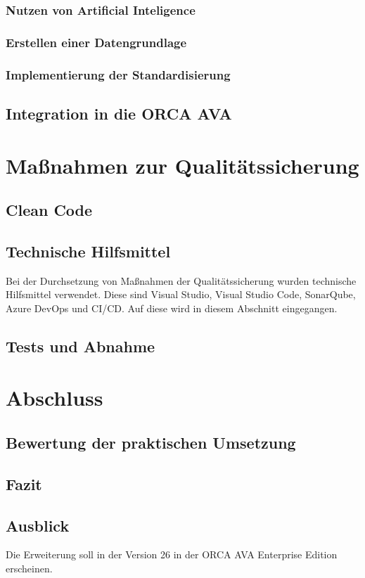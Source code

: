 \subsection{Nutzen von Artificial Inteligence}

\subsection{Erstellen einer Datengrundlage}
\subsection{Implementierung der Standardisierung}

\section{Integration in die ORCA AVA}



\chapter{Maßnahmen zur Qualitätssicherung}
\label{c:qs}
\section{Clean Code}
\label{c:qs:cleancode}
\section{Technische Hilfsmittel}
\label{c:qs:technical_aids}
Bei der Durchsetzung von Maßnahmen der Qualitätssicherung wurden technische Hilfsmittel verwendet. Diese sind Visual Studio, Visual Studio Code, SonarQube, Azure DevOps und CI/CD. Auf diese wird in diesem Abschnitt eingegangen.
\section{Tests und Abnahme}
\label{c:qs:tests}


\chapter{Abschluss}
\label{c:closing}
\section{Bewertung der praktischen Umsetzung}
\label{c:closing:rating}
\section{Fazit}
\label{c:closing:conclusion}
\section{Ausblick}
\label{c:closing:outlook}
Die Erweiterung soll in der Version 26 in der ORCA AVA Enterprise Edition erscheinen.
